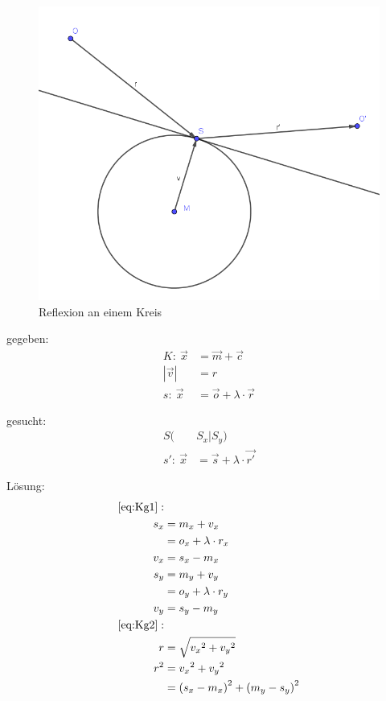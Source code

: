 \documentclass[reducespace,stylepage,semiarbeit]{spezidoc}
\begin{document}
\begin{figure}[h]
\centering
\includegraphics[scale=0.5]{pictures/CircleRef.png}
\caption{Reflexion an einem Kreis}
\end{figure}

gegeben:
\begin{subequations}
\begin{align}
K:~ \vec{x} &= \vec{m} + \vec{c} \label{eq:Kg1}\\
|\vec{v}| &= r \label{eq:Kg2} \\
s:~ \vec{x} &= \vec{o} + \lambda \cdot \vec{r} \nonumber
\end{align}
\end{subequations}

gesucht:
\begin{subequations}
\begin{align}
S(&S_x|S_y) \nonumber \\
s':~ \vec{x} &= \vec{s} + \lambda \cdot \vec{r'} \nonumber 
\end{align}
\end{subequations}

Lösung:
\begin{equation*}
\begin{split}
\ref{eq:Kg1}: &\\
s_x &= m_x + v_x \\
 &= o_x + \lambda \cdot r_x \\
v_x &= s_x - m_x \\
s_y &= m_y + v_y \\
 &= o_y + \lambda \cdot r_y \\
v_y &= s_y - m_y \\
\ref{eq:Kg2}: & \\
r &= \sqrt{{v_x}^2 + {v_y}^2} \\
r^2 &= {v_x}^2 + {v_y}^2 \\
 &= {(s_x - m_x)}^2 + {(m_y - s_y)}^2 
\end{split}
\end{equation*}
\end{document}
